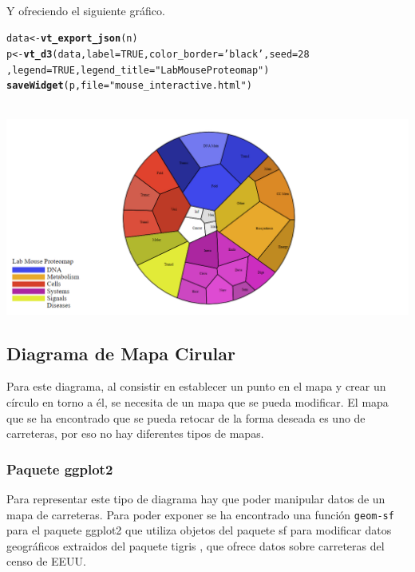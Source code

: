 \documentclass{article}\usepackage[]{graphicx}\usepackage[]{color}
\makeatletter
\newcommand{\hlnum}[1]{\textcolor[rgb]{0.686,0.059,0.569}{#1}}%
\newcommand{\hlstr}[1]{\textcolor[rgb]{0.192,0.494,0.8}{#1}}%
\newcommand{\hlstd}[1]{\textcolor[rgb]{0.345,0.345,0.345}{#1}}%
\newcommand{\hlkwb}[1]{\textcolor[rgb]{0.69,0.353,0.396}{#1}}%
\newcommand{\hlkwc}[1]{\textcolor[rgb]{0.333,0.667,0.333}{#1}}%
\newcommand{\hlkwd}[1]{\textcolor[rgb]{0.737,0.353,0.396}{\textbf{#1}}}%
\newenvironment{kframe}{%
 \def\at@end@of@kframe{}%
 \ifinner\ifhmode%
  \def\at@end@of@kframe{\end{minipage}}%
  \begin{minipage}{\columnwidth}%
 \fi\fi%
 \def\FrameCommand##1{\hskip\@totalleftmargin \hskip-\fboxsep
 \colorbox{shadecolor}{##1}\hskip-\fboxsep
     \hskip-\linewidth \hskip-\@totalleftmargin \hskip\columnwidth}%
 \MakeFramed {\advance\hsize-\width
   \@totalleftmargin\z@ \linewidth\hsize
   \@setminipage}}%
 {\par\unskip\endMakeFramed%
 \at@end@of@kframe}
\newenvironment{knitrout}{}{} %
\makeatother
\begin{document}
~\\
Y ofreciendo el siguiente gr\'afico.
\begin{knitrout}
\color{fgcolor}\begin{kframe}
\begin{alltt}
\hlstd{data}\hlkwb{<-}\hlkwd{vt_export_json}\hlstd{(n)}
\hlstd{p} \hlkwb{<-} \hlkwd{vt_d3}\hlstd{(data,} \hlkwc{label} \hlstd{=} \hlnum{TRUE}\hlstd{,}\hlkwc{color_border} \hlstd{=} \hlstr{'black'}\hlstd{,} \hlkwc{seed} \hlstd{=} \hlnum{28}
      \hlstd{,} \hlkwc{legend} \hlstd{=} \hlnum{TRUE}\hlstd{,} \hlkwc{legend_title} \hlstd{=} \hlstr{"Lab Mouse Proteomap"}\hlstd{)}
\hlkwd{saveWidget}\hlstd{(p,} \hlkwc{file} \hlstd{=} \hlstr{"mouse_interactive.html"}\hlstd{)}
\end{alltt}
\end{kframe}
\end{knitrout}
~\\
\vbox{
    \centering
    \includegraphics[width=1.2\textwidth]{imag/mouse_interactive}
}
\clearpage
\subsection{Diagrama de Mapa Cirular}\label{ssec:carretera}
Para este diagrama, al consistir en establecer un punto en el mapa y crear un c\'irculo en torno a \'el, se necesita de un mapa que se pueda modificar. El mapa que se ha encontrado que se pueda retocar de la forma deseada es uno de carreteras, por eso no hay diferentes tipos de mapas.
\subsubsection{Paquete ggplot2}
Para representar este tipo de diagrama hay que poder manipular datos de un mapa de carreteras. Para poder exponer se ha encontrado una funci\'on \texttt{geom-sf} para el paquete ggplot2 \cite{docu_ggplot2}
que utiliza objetos del paquete sf para modificar datos geogr\'aficos extraidos del paquete tigris \cite{docu_tigris}
, que ofrece datos sobre carreteras del censo de EEUU.  
\end{document}
